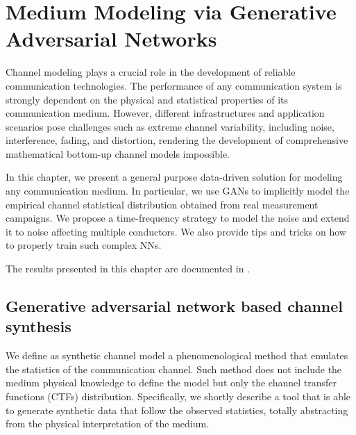 \chapter{Medium Modeling via Generative Adversarial Networks} %
\label{sec:medium}
Channel modeling plays a crucial role in the development of reliable communication technologies. The performance of any communication system is strongly dependent on the physical and statistical properties of its communication medium. However, different infrastructures and application scenarios pose challenges such as extreme channel variability, including noise, interference, fading, and distortion, rendering the development of comprehensive mathematical bottom-up channel models impossible. 

In this chapter, we present a general purpose data-driven solution for modeling any communication medium. In particular, we use GANs to implicitly model the empirical channel statistical distribution obtained from real measurement campaigns. We propose a time-frequency strategy to model the noise and extend it to noise affecting multiple conductors. We also provide tips and tricks on how to properly train such complex NNs.

The results presented in this chapter are documented in \cite{RighiniLetizia2019,Letizia2019a}.


\section{Generative adversarial network based channel synthesis}
\label{sec:gan_ch_synthesis}
We define as synthetic channel model a phenomenological method that emulates the statistics of the communication channel. Such method does not include the medium physical knowledge to define the model but only the channel transfer functions (CTFs) distribution. Specifically, we shortly describe a tool that is able to generate synthetic data that follow the observed statistics, totally abstracting from the physical interpretation of the medium.

